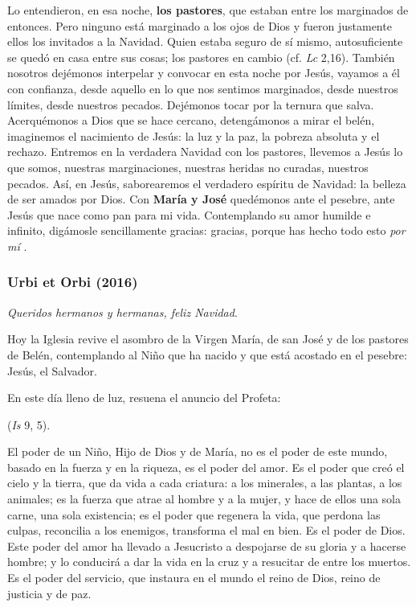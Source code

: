 \begin{body}
\begin{body}
Lo entendieron, en esa noche, \textbf{los pastores}, que estaban entre los marginados de entonces. Pero ninguno está marginado a los ojos de Dios y fueron justamente ellos los invitados a la Navidad. Quien estaba seguro de sí mismo, autosuficiente se quedó en casa entre sus cosas; los pastores en cambio  (cf. \emph{Lc} 2,16). También nosotros dejémonos interpelar y convocar en esta noche por Jesús, vayamos a él con confianza, desde aquello en lo que nos sentimos marginados, desde nuestros límites, desde nuestros pecados. Dejémonos tocar por la ternura que salva. Acerquémonos a Dios que se hace cercano, detengámonos a mirar el belén, imaginemos el nacimiento de Jesús: la luz y la paz, la pobreza absoluta y el rechazo. Entremos en la verdadera Navidad con los pastores, llevemos a Jesús lo que somos, nuestras marginaciones, nuestras heridas no curadas, nuestros pecados. Así, en Jesús, saborearemos el verdadero espíritu de Navidad: la belleza de ser amados por Dios. Con \textbf{María y José} quedémonos ante el pesebre, ante Jesús que nace como pan para mi vida. Contemplando su amor humilde e infinito, digámosle sencillamente gracias: gracias, porque has hecho todo esto \emph{por mí} .




\subsubsection{Urbi et Orbi (2016)}

\emph{Queridos hermanos y hermanas, feliz Navidad}.

Hoy la Iglesia revive el asombro de la Virgen María, de san José y de los pastores de Belén, contemplando al Niño que ha nacido y que está acostado en el pesebre: Jesús, el Salvador.

En este día lleno de luz, resuena el anuncio del Profeta:

 (\emph{Is} 9, 5).

El poder de un Niño, Hijo de Dios y de María, no es el poder de este mundo, basado en la fuerza y en la riqueza, es el poder del amor. Es el poder que creó el cielo y la tierra, que da vida a cada criatura: a los minerales, a las plantas, a los animales; es la fuerza que atrae al hombre y a la mujer, y hace de ellos una sola carne, una sola existencia; es el poder que regenera la vida, que perdona las culpas, reconcilia a los enemigos, transforma el mal en bien. Es el poder de Dios. Este poder del amor ha llevado a Jesucristo a despojarse de su gloria y a hacerse hombre; y lo conducirá a dar la vida en la cruz y a resucitar de entre los muertos. Es el poder del servicio, que instaura en el mundo el reino de Dios, reino de justicia y de paz.


\end{body}
\end{body}
